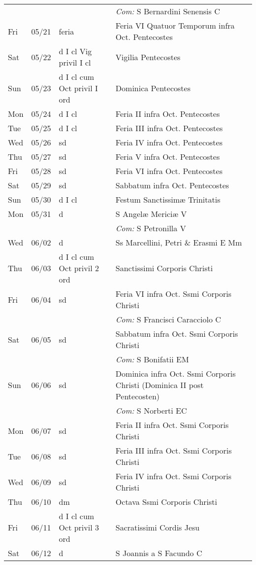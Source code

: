 \documentclass[10pt]{article}
\begin{document}
\begin{longtable}{ l l l l }
 & & & \textit{Com:} S Bernardini Senensis C\\
Fri & 05/21 & feria & Feria VI Quatuor Temporum infra Oct. Pentecostes\\
Sat & 05/22 & d I cl Vig privil I cl & Vigilia Pentecostes\\
Sun & 05/23 & d I cl cum Oct privil I ord & Dominica Pentecostes\\
Mon & 05/24 & d I cl & Feria II infra Oct. Pentecostes\\
Tue & 05/25 & d I cl & Feria III infra Oct. Pentecostes\\
Wed & 05/26 & sd & Feria IV infra Oct. Pentecostes\\
Thu & 05/27 & sd & Feria V infra Oct. Pentecostes\\
Fri & 05/28 & sd & Feria VI infra Oct. Pentecostes\\
Sat & 05/29 & sd & Sabbatum infra Oct. Pentecostes\\
Sun & 05/30 & d I cl & Festum Sanctissimæ Trinitatis\\
Mon & 05/31 & d & S Angelæ Mericiæ V\\
 & & & \textit{Com:} S Petronilla V\\
Wed & 06/02 & d & Ss Marcellini, Petri \& Erasmi E Mm\\
Thu & 06/03 & d I cl cum Oct privil 2 ord & Sanctissimi Corporis Christi\\
Fri & 06/04 & sd & Feria VI infra Oct. Ssmi Corporis Christi\\
 & & & \textit{Com:} S Francisci Caracciolo C\\
Sat & 06/05 & sd & Sabbatum infra Oct. Ssmi Corporis Christi\\
 & & & \textit{Com:} S Bonifatii EM\\
Sun & 06/06 & sd & Dominica infra Oct. Ssmi Corporis Christi (Dominica II post Pentecosten)\\
 & & & \textit{Com:} S Norberti EC\\
Mon & 06/07 & sd & Feria II infra Oct. Ssmi Corporis Christi\\
Tue & 06/08 & sd & Feria III infra Oct. Ssmi Corporis Christi\\
Wed & 06/09 & sd & Feria IV infra Oct. Ssmi Corporis Christi\\
Thu & 06/10 & dm & Octava Ssmi Corporis Christi\\
Fri & 06/11 & d I cl cum Oct privil 3 ord & Sacratissimi Cordis Jesu\\
Sat & 06/12 & d & S Joannis a S Facundo C\\

\end{longtable}
\end{document}
